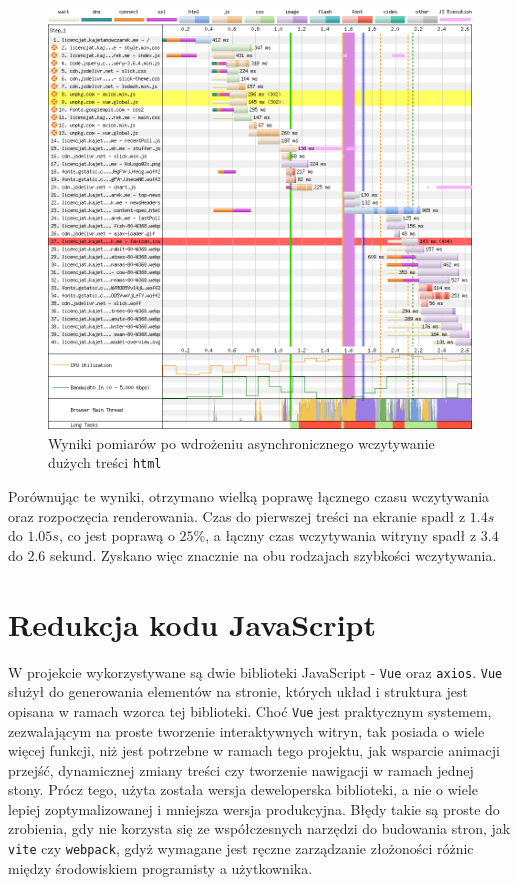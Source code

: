 \documentclass[licencjacka]{pracadypl}
\begin{document}
\begin{figure}[H]
  \centering
  \includegraphics[width=\linewidth]{images/waterfall-after-async-html.png}
  \caption{Wyniki pomiarów po wdrożeniu asynchronicznego wczytywanie dużych treści \texttt{html}}
  \label{fig:waterfall-after-async-html}
\end{figure}

Porównując te wyniki, otrzymano wielką poprawę łącznego czasu wczytywania oraz rozpoczęcia renderowania. Czas do pierwszej treści na ekranie spadł z $1.4s$ do $1.05s$, co jest poprawą o $25\%$, a łączny czas wczytywania witryny spadł z $3.4$ do $2.6$ sekund. Zyskano więc znacznie na obu rodzajach szybkości wczytywania.

\section{Redukcja kodu JavaScript}

W projekcie wykorzystywane są dwie biblioteki JavaScript - \texttt{Vue} oraz \texttt{axios}. \texttt{Vue} służył do generowania elementów na stronie, których układ i struktura jest opisana w ramach wzorca tej biblioteki. Choć \texttt{Vue} jest praktycznym systemem, zezwalającym na proste tworzenie interaktywnych witryn, tak posiada o wiele więcej funkcji, niż jest potrzebne w ramach tego projektu, jak wsparcie animacji przejść, dynamicznej zmiany treści czy tworzenie nawigacji w ramach jednej stony. Prócz tego, użyta została wersja deweloperska biblioteki, a nie o wiele lepiej zoptymalizowanej i mniejsza wersja produkcyjna. Błędy takie są proste do zrobienia, gdy nie korzysta się ze współczesnych narzędzi do budowania stron, jak \texttt{vite} czy \texttt{webpack}, gdyż wymagane jest ręczne zarządzanie złożoności różnic między środowiskiem programisty a użytkownika. 
\end{document}
